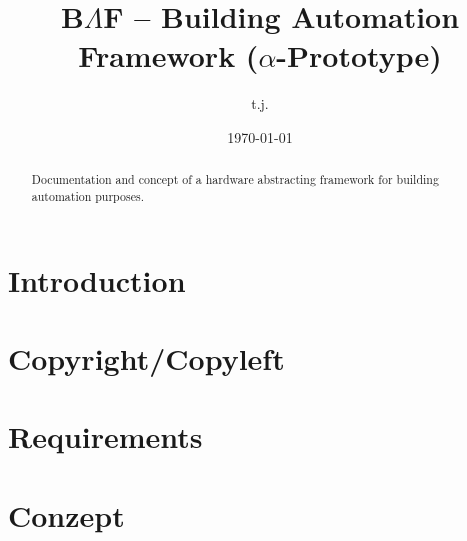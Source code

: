 \documentclass{hswpaper}
\title{B$\Lambda$F -- Building Automation Framework ($\alpha$-Prototype)}
\author{t.j.}
\date{\today}
\begin{document}
\maketitle
\begin{abstract}
Documentation and concept of a hardware abstracting framework for building automation purposes.
\end{abstract}
\tableofcontents
\section{Introduction}
\section{Copyright/Copyleft}
\section{Requirements}
\section{Conzept}
\end{document}
